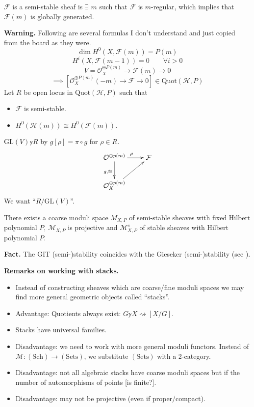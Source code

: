$\mathcal{F}$ is a semi-stable sheaf is  $\exists $ $m$ such that
$\mathcal{F}$ is $m$-regular, which implies that $\mathcal{F}(m)$ is globally
generated.

\medskip\noindent 
{\bf Warning.} Following are several formulas I don't understand and just copied
from the board as they were.
 $$
\dim H^{0}(X,\mathcal{F}(m))=P(m)
$$
$$
H^{i}(X,\mathcal{F}(m-1))=0\qquad \forall i>0
$$
$$
V=\mathcal{O}_X^{\oplus P(m)}\to \mathcal{F}(m)\to 0
$$
$$
\implies \left[ \mathcal{O}_X^{\oplus P(m)}(-m) \to \mathcal{F} \to 0 \right]
\in \text{Quot}(\mathcal{H},P)
$$
Let $R$ be open locus in $\text{Quot}(\mathcal{H},P)$ such that
\begin{itemize}
\item $\mathcal{F}$ is semi-stable.
\item $H^{0}(\mathcal{H}(m))\cong H^{0}(\mathcal{F}(m))$.
\end{itemize}
$\text{GL}(V)\mathbb{y} R$ by $g[\rho]=\pi \circ g$ for $\rho \in R$. 
$$
\xymatrix{
\mathcal{O}^{\oplus p(m)}\ar[r]^{\rho}\ar[d]_{g,\cong}&  \mathcal{F}\\
\mathcal{O}_X^{\oplus p(m)}\ar[ur]
}
$$
We want
``$R/\text{GL}(V)$''.

\begin{theorem}
\label{theorem-exists-coarse-moduli-space-of-semi-stable-sheaves-with-fixed
-Hilbert-polynomial}
There exists a coarse moduli space $M_{X,P}$ of semi-stable sheaves with fixed
Hilbert polynomial $P$, $\mathcal{M}_{X,P}$ is projective and
$\mathcal{M}_{X,P}^s$ of stable sheaves with Hilbert polynomial $P$.
\end{theorem}

\medskip\noindent
{\bf Fact.} The GIT (semi-)stability coincides with the Gieseker
(semi-)stability (see \cite{HL}).

\medskip\noindent
{\bf Remarks on working with stacks.}

\begin{itemize}
\item Instead of constructing sheaves which are coarse/fine moduli spaces we may
find more general geometric objects called ``stacks''.
\item Advantage: Quotients always exist: 
$G \mathbb{y} X \rightsquigarrow [X/G]$.
\item Stacks have universal families.
\item Disadvantage: we need to work with more general moduli functors. Instead
of $\mathcal{M}:(\text{Sch}) \to (\text{Sets})$, we substitute $(\text{Sets})$
with a 2-category.
\item Disadvantage: not all algebraic stacks have coarse moduli spaces but if
the number of automorphisms of points [is finite?].
\item Disadvantage: may not be projective (even if proper/compact).
\end{itemize}

